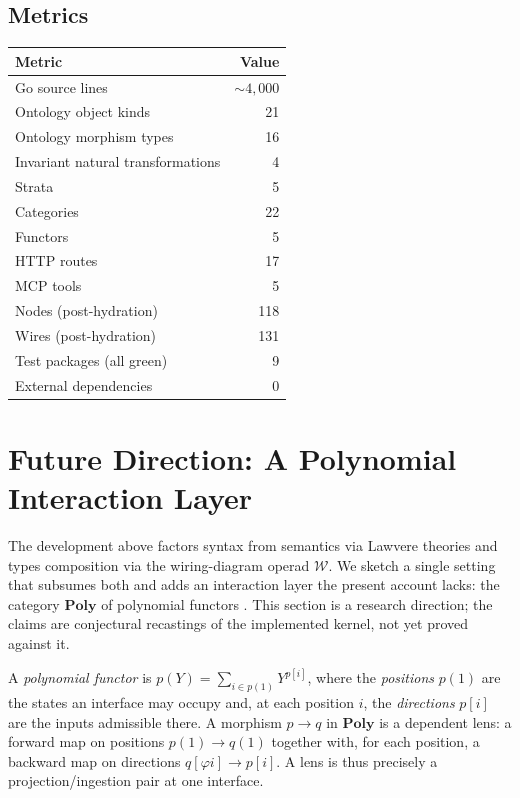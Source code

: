 \documentclass[submission,copyright,creativecommons]{eptcs}
\begin{document}
\subsection{Metrics}

\begin{center}
\begin{tabular}{@{}lr@{}}
\toprule
Metric & Value \\
\midrule
Go source lines & ${\sim}4{,}000$ \\
Ontology object kinds & 21 \\
Ontology morphism types & 16 \\
Invariant natural transformations & 4 \\
Strata & 5 \\
Categories & 22 \\
Functors & 5 \\
HTTP routes & 17 \\
MCP tools & 5 \\
Nodes (post-hydration) & 118 \\
Wires (post-hydration) & 131 \\
Test packages (all green) & 9 \\
External dependencies & 0 \\
\bottomrule
\end{tabular}
\end{center}

\section{Future Direction: A Polynomial Interaction Layer}
\label{sec:poly}

The development above factors syntax from semantics via Lawvere theories and
types composition via the wiring-diagram operad $\mathcal{W}$. We sketch a
single setting that subsumes both and adds an interaction layer the present
account lacks: the category $\mathbf{Poly}$ of polynomial functors
\cite{niu2024poly,spivak2021abacus}. This section is a research direction; the
claims are conjectural recastings of the implemented kernel, not yet proved
against it.

A \emph{polynomial functor} is $p(Y) = \sum_{i \in p(1)} Y^{p[i]}$, where the
\emph{positions} $p(1)$ are the states an interface may occupy and, at each
position $i$, the \emph{directions} $p[i]$ are the inputs admissible there. A
morphism $p \to q$ in $\mathbf{Poly}$ is a dependent lens: a forward map on
positions $p(1) \to q(1)$ together with, for each position, a backward map on
directions $q[\varphi i] \to p[i]$. A lens is thus precisely a
projection/ingestion pair at one interface.
\end{document}

